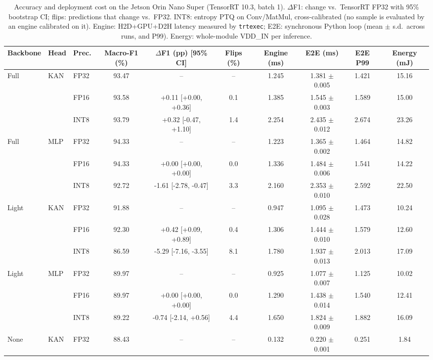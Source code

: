 \begin{table}[t]
\centering
\caption{Accuracy and deployment cost on the Jetson Orin Nano Super (TensorRT 10.3, batch 1). $\Delta$F1: change vs.\ TensorRT FP32 with 95\% bootstrap CI; flips: predictions that change vs.\ FP32. INT8: entropy PTQ on Conv/MatMul, cross-calibrated (no sample is evaluated by an engine calibrated on it). Engine: H2D+GPU+D2H latency measured by \texttt{trtexec}; E2E: synchronous Python loop (mean $\pm$ s.d.\ across runs, and P99). Energy: whole-module VDD\_IN per inference.}
\label{tab:main}
\setlength{\tabcolsep}{3.5pt}
\small
\begin{tabular}{lllccccccc}
\toprule
Backbone & Head & Prec. & Macro-F1 (\%) & $\Delta$F1 (pp) [95\% CI] & Flips (\%) & Engine (ms) & E2E (ms) & E2E P99 & Energy (mJ) \\
\midrule
Full & KAN & FP32 & 93.47 & -- & -- & 1.245 & 1.381 $\pm$ 0.005 & 1.421 & 15.16 \\
 &  & FP16 & 93.58 & +0.11 [+0.00, +0.36] & 0.1 & 1.385 & 1.545 $\pm$ 0.003 & 1.589 & 15.00 \\
 &  & INT8 & 93.79 & +0.32 [-0.47, +1.10] & 1.4 & 2.254 & 2.435 $\pm$ 0.012 & 2.674 & 23.26 \\
\addlinespace[2pt]
Full & MLP & FP32 & 94.33 & -- & -- & 1.223 & 1.365 $\pm$ 0.002 & 1.464 & 14.82 \\
 &  & FP16 & 94.33 & +0.00 [+0.00, +0.00] & 0.0 & 1.336 & 1.484 $\pm$ 0.006 & 1.541 & 14.22 \\
 &  & INT8 & 92.72 & -1.61 [-2.78, -0.47] & 3.3 & 2.160 & 2.353 $\pm$ 0.010 & 2.592 & 22.50 \\
\addlinespace[2pt]
Light & KAN & FP32 & 91.88 & -- & -- & 0.947 & 1.095 $\pm$ 0.028 & 1.473 & 10.24 \\
 &  & FP16 & 92.30 & +0.42 [+0.09, +0.89] & 0.4 & 1.306 & 1.444 $\pm$ 0.010 & 1.579 & 12.60 \\
 &  & INT8 & 86.59 & -5.29 [-7.16, -3.55] & 8.1 & 1.780 & 1.937 $\pm$ 0.013 & 2.013 & 17.09 \\
\addlinespace[2pt]
Light & MLP & FP32 & 89.97 & -- & -- & 0.925 & 1.077 $\pm$ 0.007 & 1.125 & 10.02 \\
 &  & FP16 & 89.97 & +0.00 [+0.00, +0.00] & 0.0 & 1.290 & 1.438 $\pm$ 0.014 & 1.540 & 12.41 \\
 &  & INT8 & 89.22 & -0.74 [-2.14, +0.56] & 4.4 & 1.650 & 1.824 $\pm$ 0.009 & 1.882 & 16.09 \\
\addlinespace[2pt]
None & KAN & FP32 & 88.43 & -- & -- & 0.132 & 0.220 $\pm$ 0.001 & 0.251 & 1.84 \\

\end{tabular}
\end{table}
